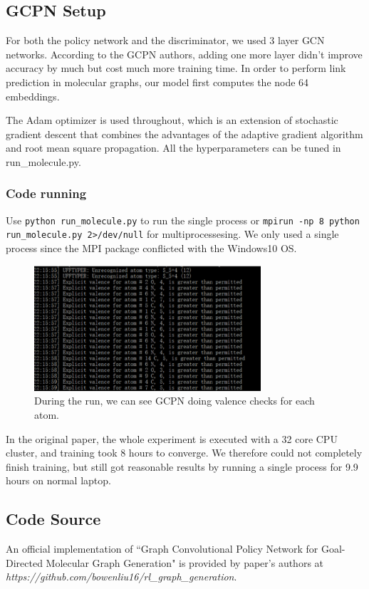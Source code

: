 \documentclass{article}
\begin{document}
\subsection{GCPN Setup}
For both the policy network and the discriminator, we used 3 layer GCN networks. According to the GCPN authors, adding one more layer didn’t improve accuracy by much but cost much more training time. In order to perform link prediction in molecular graphs, our model first computes the node 64 embeddings.

The Adam optimizer is used throughout, which is an extension of stochastic gradient descent that combines the advantages of the adaptive gradient algorithm and root mean square propagation. All the hyperparameters can be tuned in run\_molecule.py.

\subsubsection*{Code running}
Use \texttt{python run\_molecule.py} to run the single process or \texttt{mpirun -np 8 python run\_molecule.py 2>/dev/null} for multiprocessesing. We only used a single process since the MPI package conflicted with the Windows10 OS.
\begin{figure}[h]
    \centering
    \includegraphics[width=0.75\textwidth]{valencechecks.png}
    \caption{During the run, we can see GCPN doing valence checks for each atom.}
    \label{fig:valencechecks}
\end{figure}

In the original paper, the whole experiment is executed with a 32 core CPU cluster, and training took 8 hours to converge. We therefore could not completely finish training, but still got reasonable results by running a single process for 9.9 hours on normal laptop.

\subsection{Code Source}
An official implementation of ``Graph Convolutional Policy Network for Goal-Directed Molecular Graph Generation" is provided by paper's authors at \textit{https://github.com/bowenliu16/rl\_graph\_generation}.
\end{document}
